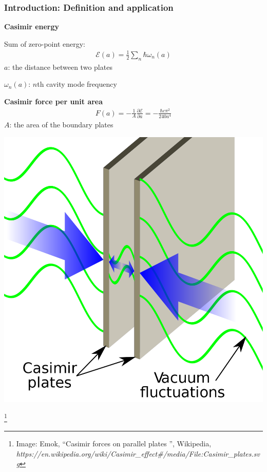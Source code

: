 \documentclass[dvipsnames,10pt]{beamer}
\newcommand\blfootnote[1]{%
  \begingroup
  \renewcommand\thefootnote{}\footnote{#1}%
  \addtocounter{footnote}{-1}%
  \endgroup
}
\begin{document}
\begin{frame}
    \frametitle{Introduction: Definition and application}

    \vspace{.5cm}
    
      \begin{minipage}{6.5cm}
    \begin{tcolorbox}
    \textbf{Casimir energy}
    
        Sum of zero-point energy:
        \begin{align*}
        \mathcal{E}(a) = \frac{1}{2}\sum_{n}\hbar\omega_{n}(a)
\end{align*}
$a$: the distance between two plates

$\omega_{n}(a)$: $n$th cavity mode frequency
    \end{tcolorbox}
 
   \begin{tcolorbox}
      \textbf{Casimir force per unit area}
\begin{align*}
    F(a) = -\frac{1}{A}\frac{\partial\mathcal{E}}{\partial a} = -\frac{\hbar c\pi^{2}}{240a^{4}}
\end{align*}
$A$: the area of the boundary plates
   \end{tcolorbox} 
    \end{minipage}
    \hspace*{0.3cm}
    \begin{minipage}{3cm}
        \includegraphics[scale = 0.1]{figs/Casimir_plates.png}
    \end{minipage}
    \blfootnote{Image: Emok, ``Casimir forces on parallel plates
'', Wikipedia, \textit{https://en.wikipedia.org/wiki/Casimir\_effect#/media/File:Casimir\_plates.svg}}


\end{frame}
\end{document}
